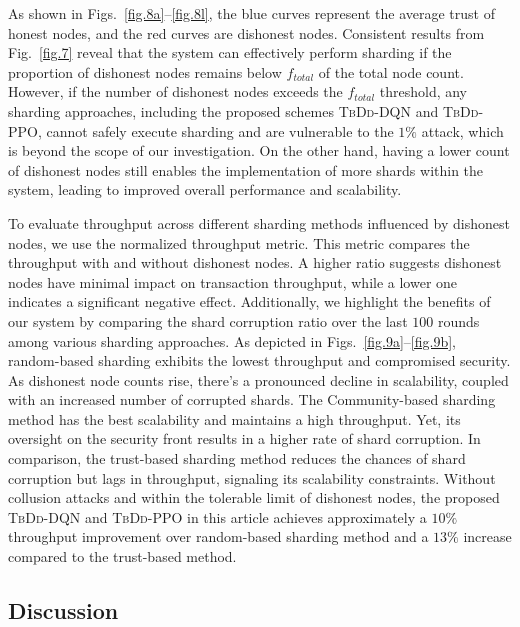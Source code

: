 As shown in Figs.~\ref{fig.8a}--\ref{fig.8l}, the blue curves represent the average trust of honest nodes, and the red curves are dishonest nodes. Consistent results from Fig.~\ref{fig.7} reveal that the system can effectively perform sharding if the proportion of dishonest nodes remains below $f_{total}$ of the total node count. However, if the number of dishonest nodes exceeds the $f_{total}$ threshold, any sharding approaches, including the proposed schemes \textsc{\textsc{TbDd}-DQN} and \textsc{\textsc{TbDd}-PPO}, cannot safely execute sharding and are vulnerable to the $1\%$ attack, which is beyond the scope of our investigation. On the other hand, having a lower count of dishonest nodes still enables the implementation of more shards within the system, leading to improved overall performance and scalability.



To evaluate throughput across different sharding methods influenced by dishonest nodes, we use the normalized throughput metric. This metric compares the throughput with and without dishonest nodes. A higher ratio suggests dishonest nodes have minimal impact on transaction throughput, while a lower one indicates a significant negative effect. Additionally, we highlight the benefits of our system by comparing the shard corruption ratio over the last $100$ rounds among various sharding approaches. As depicted in Figs.~\ref{fig.9a}--\ref{fig.9b}, random-based sharding exhibits the lowest throughput and compromised security. As dishonest node counts rise, there's a pronounced decline in scalability, coupled with an increased number of corrupted shards. The Community-based sharding method has the best scalability and maintains a high throughput. Yet, its oversight on the security front results in a higher rate of shard corruption. In comparison, the trust-based sharding method reduces the chances of shard corruption but lags in throughput, signaling its scalability constraints. Without collusion attacks and within the tolerable limit of dishonest nodes, the proposed \textsc{\textsc{TbDd}-DQN} and \textsc{\textsc{TbDd}-PPO} in this article achieves approximately a $10\%$ throughput improvement over random-based sharding method and a $13\%$ increase compared to the trust-based method.




\subsection{Discussion}

